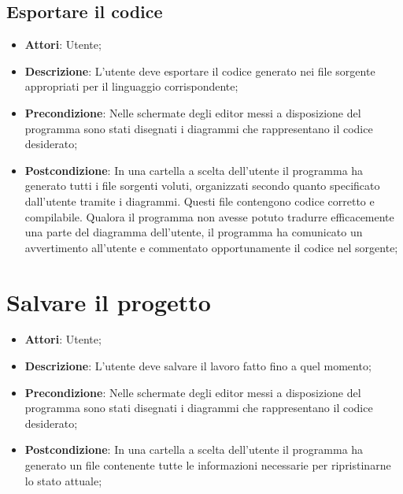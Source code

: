 \documentclass[../AnalisiDeiRequisiti.tex]{subfiles}
\begin{document}
	\subsection{Esportare il codice}
	\begin{itemize}
		\item \textbf{Attori}: Utente;
		\item \textbf{Descrizione}: L'utente deve esportare il codice generato nei file sorgente appropriati per il linguaggio corrispondente;
		\item \textbf{Precondizione}: Nelle schermate degli editor messi a disposizione del programma sono stati disegnati i diagrammi che rappresentano il codice desiderato;
		\item \textbf{Postcondizione}: In una cartella a scelta dell'utente il programma ha generato tutti i file sorgenti voluti, organizzati secondo quanto specificato dall'utente tramite i diagrammi. Questi file contengono codice corretto e compilabile. Qualora il programma non avesse potuto tradurre efficacemente una parte del diagramma dell'utente, il programma ha comunicato un avvertimento all'utente e commentato opportunamente il codice nel sorgente;
	\end{itemize}
	
	\section{Salvare il progetto}
	\begin{itemize}
		\item \textbf{Attori}: Utente;
		\item \textbf{Descrizione}: L'utente deve salvare il lavoro fatto fino a quel momento;
		\item \textbf{Precondizione}: Nelle schermate degli editor messi a disposizione del programma sono stati disegnati i diagrammi che rappresentano il codice desiderato;
		\item \textbf{Postcondizione}: In una cartella a scelta dell'utente il programma ha generato un file contenente tutte le informazioni necessarie per ripristinarne lo stato attuale;
	\end{itemize}		
			
\end{document}
